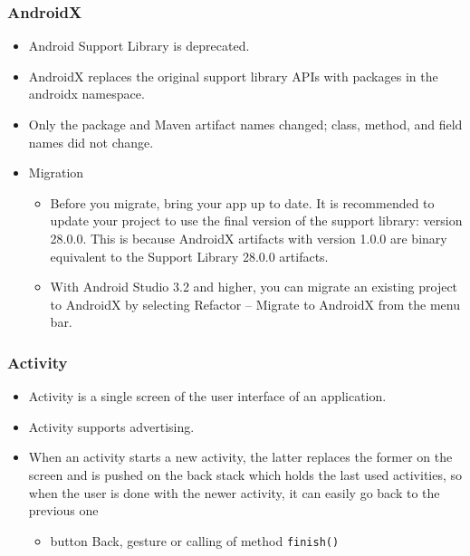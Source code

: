 \documentclass[10pt,xcolor=pdflatex]{beamer}
\begin{document}
\begin{frame}\frametitle{AndroidX}
	\begin{itemize}
	  \item Android Support Library is deprecated.
      \item AndroidX replaces the original support library APIs with packages in the androidx namespace. 
      \item Only the package and Maven artifact names changed; class, method, and field names did not change.
      \item Migration
        \begin{itemize}
            \item Before you migrate, bring your app up to date. It is recommended to update your project to use the final version of the support library: version 28.0.0. This is because AndroidX artifacts with version 1.0.0 are binary equivalent to the Support Library 28.0.0 artifacts.
            \item With Android Studio 3.2 and higher, you can migrate an existing project to AndroidX by selecting Refactor -- Migrate to AndroidX from the menu bar.
        \end{itemize}
    \end{itemize}
\end{frame}


\begin{frame}\frametitle{Activity}
	\begin{itemize}
		\item Activity is a single screen of the user interface of an application.
		\item Activity supports advertising.
		\item When an activity starts a new activity, the latter replaces the former on the screen and is pushed on the back stack which holds the last used activities, so when the user is done with the newer activity, it can easily go back to the previous one
          \begin{itemize}
            \item button Back, gesture or calling of method \texttt{finish()}
          \end{itemize}
	\end{itemize}
\end{frame}
\end{document}
